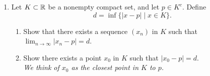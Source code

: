 \documentclass[12pt]{article}
\newcommand{\disabs}[1]{\ensuremath{\left|#1\right|}}
\newenvironment{solution}{\textit{Solution.}}
\newcommand{\R}{\ensuremath{\mathbb{R}}}
\begin{document}
\begin{enumerate}
\begin{solution}
              \textbf{Step 3: Find the limit \(L\).}

              Taking the limit on both sides of the recursion and solving for \(L\):
              \begin{align*}
                  \lim_{n \to \infty} x_{n + 1} & = \lim_{n \to \infty} \left(2 + \sqrt{x_n - 2}\right) \\
                  L                             & = 2 + \sqrt{L - 2}                                    \\
                  L - 2                         & = \sqrt{L - 2}                                        \\
                  (L - 2)^2                     & = L - 2                                               \\
                  L^2 - 4L + 4                  & = L - 2                                               \\
                  L^2 - 5L + 6                  & = 0                                                   \\
                  (L - 2)(L - 3)                & = 0.
              \end{align*}
              Therefore, \(L = 2\) or \(L = 3\). Since \(L \geq 3\), the limit is \(L = 3\).

              The sequence \((x_n)\) converges to 3.
          \end{solution}

          \setcounter{enumi}{2}
    \item Let \(K \subset \R\) be a nonempty compact set, and let \(p \in K^{c}\). Define
          \[
              d = \inf\{\disabs{x - p} \mid x \in K\}.
          \]
          \begin{enumerate}
              \item Show that there exists a sequence \((x_n)\) in \(K\) such that \(\displaystyle\lim_{n \to \infty} \disabs{x_n - p} = d\).
              \item Show there exists a point \(x_0\) in \(K\) such that \(\disabs{x_0 - p} = d\). \\
                    \textit{We think of \(x_0\) as the closest point in \(K\) to \(p\).}
          \end{enumerate}


\end{enumerate}
\end{document}
